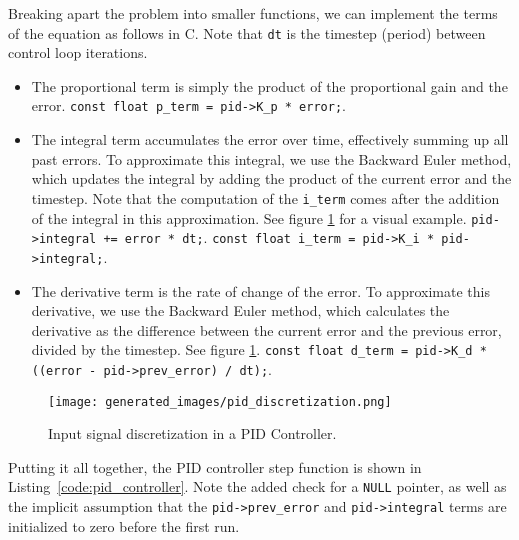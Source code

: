 \documentclass[main.tex]{subfiles}
\begin{document}
\noindent Breaking apart the problem into smaller functions, we can implement the terms of the equation as follows in C. Note that \texttt{dt} is the timestep (period) between control loop iterations.
\begin{itemize}
    \item The proportional term is simply the product of the proportional gain and the error. \newline
    \texttt{const float p\_term = pid->K\_p * error;}.
    \item The integral term accumulates the error over time, effectively summing up all past errors. To approximate this integral, we use the Backward Euler method, which updates the integral by adding the product of the current error and the timestep. Note that the computation of the \texttt{i\_term} comes after the addition of the integral in this approximation. See figure \ref{fig:pid_signal_discretization} for a visual example. \newline 
    \texttt{pid->integral += error * dt;}. \newline
    \texttt{const float i\_term = pid->K\_i * pid->integral;}. \newline
    \item The derivative term is the rate of change of the error. To approximate this derivative, we use the Backward Euler method, which calculates the derivative as the difference between the current error and the previous error, divided by the timestep. See figure \ref{fig:pid_signal_discretization}.\newline
    \texttt{const float d\_term = pid->K\_d * ((error - pid->prev\_error) / dt);}.
\end{itemize}

\begin{figure}[H]
    \centering
    \texttt{[image: generated\_images/pid\_discretization.png]}
    \caption{Input signal discretization in a PID Controller.}
    \label{fig:pid_signal_discretization}
\end{figure}

\noindent Putting it all together, the PID controller step function is shown in Listing~\ref{code:pid_controller}. Note the added check for a \texttt{NULL} pointer, as well as the implicit assumption that the \texttt{pid->prev\_error} and \texttt{pid->integral} terms are initialized to zero before the first run.


\end{document}

